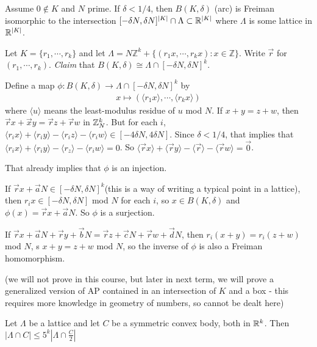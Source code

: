 \documentclass[10pt,a4paper]{report}
\newenvironment{proof}
{\begin{changemargin}{1cm}{0.5cm}
	}%
	{\end{changemargin}
}
\begin{document}
 Assume $0 \notin K$ and $N$ prime. If $\delta <1/4$, then $B(K,\delta)$ (arc) is Freiman isomorphic to the intersection $[-\delta N, \delta N]^{|K|} \cap \Lambda \subset \mathbb{R}^{|K|}$ where $\Lambda$ is some lattice in $\mathbb{R}^{|K|}$. 
\begin{proof}
\pf Let $K = \{r_1, \cdots, r_k\}$ and let $\Lambda = N \mathbb{Z}^k + \{(r_1x, \cdots, r_kx) : x\in \mathbb{Z}\}$. Write $\vec{r}$ for $(r_1, \cdots, r_k)$. \emph{Claim} that $B(K,\delta) \cong\Lambda \cap [-\delta N, \delta N]^k$.
\s

\quad Define a map $\phi : B(K,\delta) \rightarrow \Lambda \cap [-\delta N,\delta N]^k$ by
\begin{align*}
x \mapsto (\langle r_1 x\rangle, \cdots, \langle r_k x\rangle)
\end{align*}
where $\langle u\rangle$ means the least-modulus residue of $u$ mod $N$. If $x+ y = z+w$, then $\vec{r} x+ \vec{x} y = \vec{r} z + \vec{r} w$ in $\mathbb{Z}_N^k$. But for each $i$, $\langle r_i x \rangle + \langle r_i y \rangle - \langle r_i z \rangle- \langle r_i w \rangle \in [-4\delta N, 4\delta N]$. Since $\delta < 1/4$, that implies that $\langle r_i x \rangle + \langle r_i y \rangle - \langle r_z \rangle- \langle r_i w \rangle =0$. So $\langle \vec{r} x \rangle + \langle \vec{r} y \rangle - \langle \vec{r} \rangle- \langle \vec{r} w \rangle = \vec{0}$.

\quad That already implies that $\phi$ is an injection.

\quad If $\vec{r} x + \vec{a} N \in [-\delta N, \delta N]^k$(this is a way of writing a typical point in a lattice), then $r_i x \in [-\delta N, \delta N]$ mod $N$ for each $i$, so $x\in B(K,\delta)$ and $\phi(x) = \vec{r}x + \vec{a}N$. So $\phi$ is a surjection.

\quad If $\vec{r} x+ \vec{a} N + \vec{r} y + \vec{b} N = \vec{r} z + \vec{c}N + \vec{ r} w + \vec{d}N$, then $r_i(x+y) = r_i (z+w)$ mod $N$, s $x+y = z+w$ mod $N$, so the inverse of $\phi$ is also a Freiman homomorphism.

\eop 
\end{proof}
\s

(we will not prove in this course, but later in next term, we will prove a generalized version of AP contained in an intersection of $K$ and a box - this requires more knowledge in geometry of numbers, so cannot be dealt here)
\s

 Let $\Lambda$ be a lattice and let $C$ be a symmetric convex body, both in $\mathbb{R}^k$. Then $|\Lambda \cap C | \leq 5^k |\Lambda \cap \frac{C}{2}|$
\end{document}
